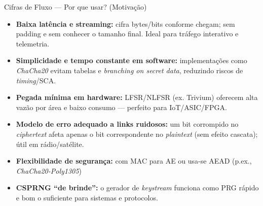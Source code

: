 \documentclass{beamer}
\begin{document}
\begin{frame}{Cifras de Fluxo — Por que usar? (Motivação)}
\begin{itemize}
    \small
    \item \textbf{Baixa latência e streaming:} cifra bytes/bits conforme chegam; sem padding e sem conhecer o tamanho final. Ideal para tráfego interativo e telemetria.
    \item \textbf{Simplicidade e tempo constante em software:} implementações como \textit{ChaCha20} evitam tabelas e \textit{branching on secret data}, reduzindo riscos de \textit{timing}/SCA.
    \item \textbf{Pegada mínima em hardware:} LFSR/NLFSR (ex. Trivium) oferecem alta vazão por área e baixo consumo — perfeito para IoT/ASIC/FPGA.
    \item \textbf{Modelo de erro adequado a links ruidosos:} um bit corrompido no \textit{ciphertext} afeta apenas o bit correspondente no \textit{plaintext} (sem efeito cascata); útil em rádio/satélite.
    \item \textbf{Flexibilidade de segurança:} com MAC para AE ou usa-se AEAD (p.ex., \textit{ChaCha20-Poly1305})
    \item \textbf{CSPRNG “de brinde”:} o gerador de \textit{keystream} funciona como PRG rápido e bom o suficiente para sistemas e protocolos.
\end{itemize}
\end{frame}

\end{document}
